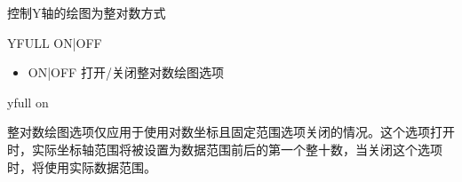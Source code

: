 \label{cmd:yfull}

控制Y轴的绘图为整对数方式

\begin{SACSTX}
YFULL ON|OFF
\end{SACSTX}

\begin{itemize}
\item ON|OFF 打开/关闭整对数绘图选项
\end{itemize}

\begin{SACDFT}
yfull on
\end{SACDFT}

整对数绘图选项仅应用于使用对数坐标且固定范围选项关闭的情况。这个选项打开时，实际坐标轴范围将被设置为数据范围前后的第一个整十数，当关闭这个选项时，将使用实际数据范围。

